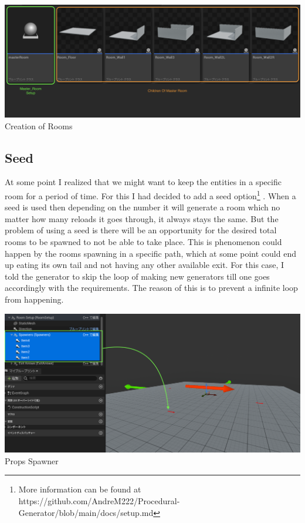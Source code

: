 \documentclass[10pt, letterpaper]{article}
\begin{document}
\begin{Form}
	\begin{center}
		\includegraphics[scale=0.4]{IMG/MasterRoomChildrenPreview.png} \\

		Creation of Rooms
	\end{center}

	\subsection{Seed}

	At some point I realized that we might want to keep the entities in a specific room for a period of time. For this
	I had decided to add a seed option\footnote{More information can be found at https://github.com/AndreM222/Procedural-Generator/blob/main/docs/setup.md}
	. When a seed is used then depending on the number it will generate a room which no matter how many reloads it goes through,
	it always stays the same. But the problem of using a seed is there will be an opportunity for the desired total rooms to
	be spawned to not be able to take place. This is phenomenon could happen by the rooms spawning in a specific path, which at
	some point could end up eating its own tail and not having any other available exit. For this case, I told the generator to
	skip the loop of making new generators till one goes accordingly with the requirements. The reason of this is to prevent a
	infinite loop from happening.

	\begin{center}
		\includegraphics[scale=0.3]{IMG/SpawnPointsPreview.png} \\
		Props Spawner \\


\end{center}
\end{Form}
\end{document}
